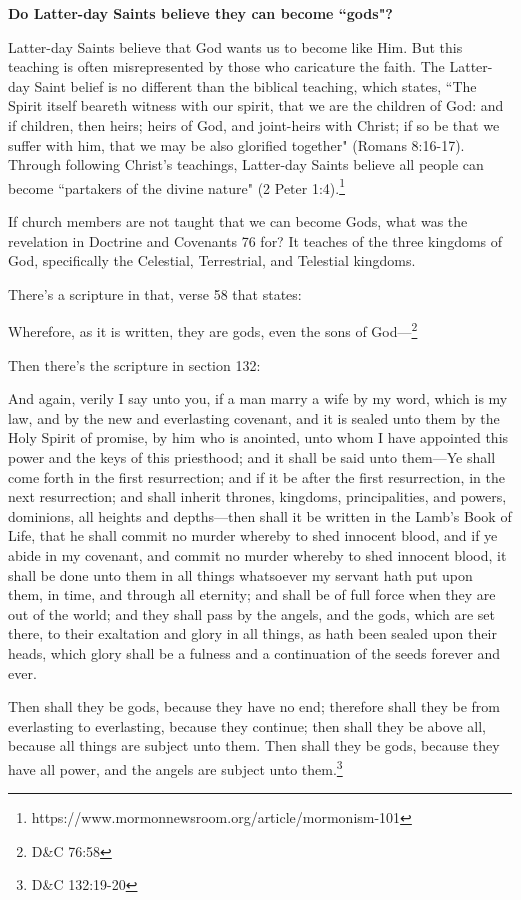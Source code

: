 \documentclass{article}
\begin{document}
\begin{displayquote}
\textbf{Do Latter-day Saints believe they can become ``gods"?}

Latter-day Saints believe that God wants us to become like Him. But this 
teaching is often misrepresented by those who caricature the faith. 
The Latter-day Saint belief is no different than the biblical teaching, 
which states, ``The Spirit itself beareth witness with our spirit, 
that we are the children of God: and if children, then heirs; heirs of God, 
and joint-heirs with Christ; if so be that we suffer with him, that we may be 
also glorified together" (Romans 8:16-17). Through following Christ's 
teachings, Latter-day Saints believe all people can become ``partakers of the 
divine nature"
(2 Peter 1:4).\footnote{https://www.mormonnewsroom.org/article/mormonism-101}
\end{displayquote}

If church members are not taught that we can become Gods, what was the 
revelation in Doctrine and Covenants 76 for? It teaches of the three kingdoms
of God, specifically the Celestial, Terrestrial, and Telestial kingdoms.

There's a scripture in that, verse 58 that states:

\begin{displayquote}
Wherefore, as it is written, they are gods, even the sons of 
God—\footnote{D\&C 76:58}
\end{displayquote}

Then there's the scripture in section 132:

\begin{displayquote}
And again, verily I say unto you, if a man marry a wife by my 
word, which is my law, and by the new and everlasting covenant, 
and it is sealed unto them by the Holy Spirit of promise, by him 
who is anointed, unto whom I have appointed this power and the keys
of this priesthood; and it shall be said unto them—Ye shall come 
forth in the first resurrection; and if it be after the first 
resurrection, in the next resurrection; and shall inherit thrones, 
kingdoms, principalities, and powers, dominions, all heights and 
depths—then shall it be written in the Lamb’s Book of Life, that 
he shall commit no murder whereby to shed innocent blood, and if 
ye abide in my covenant, and commit no murder whereby to shed innocent 
blood, it shall be done unto them in all things whatsoever my servant 
hath put upon them, in time, and through all eternity; and shall be of 
full force when they are out of the world; and they shall pass by the 
angels, and the gods, which are set there, to their exaltation and 
glory in all things, as hath been sealed upon their heads, which 
glory shall be a fulness and a continuation of the seeds 
forever and ever.

Then shall they be gods, because they have no end; therefore shall 
they be from everlasting to everlasting, because they continue; then 
shall they be above all, because all things are subject unto them. 
Then shall they be gods, because they have all power, and the 
angels are subject unto them.\footnote{D\&C 132:19-20}
\end{displayquote}
\end{document}
